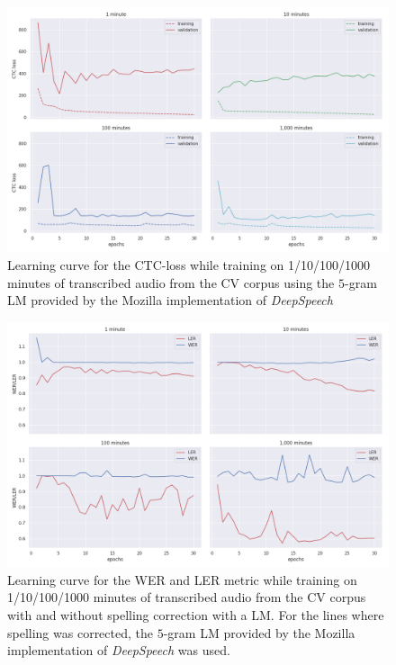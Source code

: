 \begin{figure}
	\includegraphics[width=\linewidth]{./img/lc_loss_cv.png}
	\caption{Learning curve for the CTC-loss while training on 1/10/100/1000 minutes of transcribed audio from the \ac{CV} corpus using the $5$-gram \ac{LM} provided by the Mozilla implementation of \textit{DeepSpeech}}
	\label{lc_loss_cv}
\end{figure}

\begin{figure}
	\includegraphics[width=\linewidth]{./img/lc_metrics_cv.png}
	\caption{Learning curve for the \ac{WER} and \ac{LER} metric while training on 1/10/100/1000 minutes of transcribed audio from the \ac{CV} corpus with and without spelling correction with a \ac{LM}. For the lines where spelling was corrected, the $5$-gram \ac{LM} provided by the Mozilla implementation of \textit{DeepSpeech} was used.}
	\label{lc_metrics_cv}
\end{figure}

